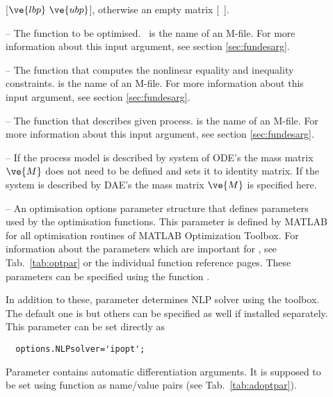 \begin{description}
  , otherwise an empty matrix [~].
\item[\argfun{objfun}] --  The function to be
  optimised.~ is the name of an M-file. For more
  information about this input argument, see section
  \ref{sec:fundesarg}. 
\item[\argfun{confun}] --  The function that computes the nonlinear
  equality and inequality constraints.  is the name of
  an M-file. For more information about this input argument, see
  section \ref{sec:fundesarg}.  
\item[\argfun{process}] -- The function that describes given
  process.  is the name of an M-file. For more
  information about this input argument, see section
  \ref{sec:fundesarg}. 
\item[\argfun{M}] -- If the process model is described by system of
  ODE's the mass matrix $\ve{M}$ does not need to be defined and
   sets it to identity matrix. If the system is described
  by DAE's the mass matrix $\ve{M}$ is specified here.

\item[\argfun{options}] -- An optimisation options parameter structure
  that defines parameters used by the optimisation functions. This
  parameter is defined by MATLAB for all optimisation routines of
  MATLAB Optimization Toolbox. For information about the parameters 
  which are important for , see Tab.~\ref{tab:optpar} or
  the individual function reference pages. These parameters can be
  specified using the function .

  In addition to these, parameter  determines NLP
  solver using the  toolbox. The default one is
   but others can be specified as well if installed
  separately. This parameter can be set directly as
  \begin{verbatim}
  options.NLPsolver='ipopt';
  \end{verbatim}
  Parameter  contains automatic
  differentiation arguments. It is supposed to be set using function
   as name/value pairs (see
  Tab.~\ref{tab:adoptpar}).
\end{description}

